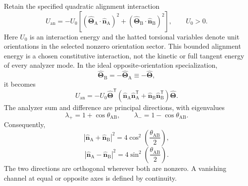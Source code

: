 Retain the specified quadratic alignment interaction
\begin{equation}
    U_{\mathrm{an}}
    =-U_0\left[
        (\widehat{\boldsymbol\Theta}_{\mathrm A}\cdot
         \widehat{\mathbf n}_{\mathrm A})^2
        +(\widehat{\boldsymbol\Theta}_{\mathrm B}\cdot
         \widehat{\mathbf n}_{\mathrm B})^2
    \right],
    \qquad U_0>0.
    \label{eq:entanglement_analyzer_energy}
\end{equation}
Here $U_0$ is an interaction energy and the hatted torsional variables denote unit orientations in the selected nonzero orientation sector. This bounded alignment energy is a chosen constitutive interaction, not the kinetic or full tangent energy of every analyzer mode. In the ideal opposite-orientation specialization,
\begin{equation}
    \widehat{\boldsymbol\Theta}_{\mathrm B}
    =-\widehat{\boldsymbol\Theta}_{\mathrm A}
    \equiv-\widehat{\boldsymbol\Theta},
\end{equation}
it becomes
\begin{equation}
    U_{\mathrm{an}}
    =-U_0\widehat{\boldsymbol\Theta}^{\mathsf T}
      \left(
          \widehat{\mathbf n}_{\mathrm A}\widehat{\mathbf n}_{\mathrm A}^{\mathsf T}
          +\widehat{\mathbf n}_{\mathrm B}\widehat{\mathbf n}_{\mathrm B}^{\mathsf T}
      \right)\widehat{\boldsymbol\Theta}.
    \label{eq:entanglement_shared_quadratic_form}
\end{equation}
The analyzer sum and difference are principal directions, with eigenvalues
\begin{equation}
    \lambda_+=1+\cos\theta_{\mathrm{AB}},
    \qquad
    \lambda_-=1-\cos\theta_{\mathrm{AB}}.
    \label{eq:entanglement_analyzer_eigenvalues}
\end{equation}
Consequently,
\begin{equation}
    \left|\widehat{\mathbf n}_{\mathrm A}
          +\widehat{\mathbf n}_{\mathrm B}\right|^2
    =4\cos^2\!\left(\frac{\theta_{\mathrm{AB}}}{2}\right),
    \label{eq:entanglement_sum_channel}
\end{equation}
\begin{equation}
    \left|\widehat{\mathbf n}_{\mathrm A}
          -\widehat{\mathbf n}_{\mathrm B}\right|^2
    =4\sin^2\!\left(\frac{\theta_{\mathrm{AB}}}{2}\right).
    \label{eq:entanglement_difference_channel}
\end{equation}
The two directions are orthogonal wherever both are nonzero. A vanishing channel at equal or opposite axes is defined by continuity.

